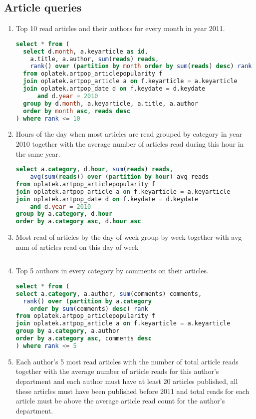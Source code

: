 \subsection*{Article queries} %
\label{sub:Article  queries}
\begin{enumerate}
\item    Top 10 read articles and their authors for every month in year 2011.
\begin{lstlisting}[language=sql] 
select * from (
  select d.month, a.keyarticle as id, 
    a.title, a.author, sum(reads) reads, 
    rank() over (partition by month order by sum(reads) desc) rank 
  from oplatek.artpop_articlepopularity f
  join oplatek.artpop_article a on f.keyarticle = a.keyarticle
  join oplatek.artpop_date d on f.keydate = d.keydate 
      and d.year = 2010
  group by d.month, a.keyarticle, a.title, a.author
  order by month asc, reads desc
) where rank <= 10
\end{lstlisting}
\item    Hours of the day when most articles are read grouped by category in year 2010 together with the average number of articles read during this hour in the same year.
\begin{lstlisting}[language=sql] 
select a.category, d.hour, sum(reads) reads, 
    avg(sum(reads)) over (partition by hour) avg_reads 
from oplatek.artpop_articlepopularity f
join oplatek.artpop_article a on f.keyarticle = a.keyarticle
join oplatek.artpop_date d on f.keydate = d.keydate 
    and d.year = 2010
group by a.category, d.hour
order by a.category asc, d.hour asc
\end{lstlisting}
\item    Most read of articles by the day of week group by week together with avg num of articles read on this day of week
\begin{lstlisting}[language=sql] 
\end{lstlisting}
\item    Top 5 authors in every category by comments on their articles.
\begin{lstlisting}[language=sql] 
select * from (
select a.category, a.author, sum(comments) comments, 
  rank() over (partition by a.category 
    order by sum(comments) desc) rank 
from oplatek.artpop_articlepopularity f
join oplatek.artpop_article a on f.keyarticle = a.keyarticle
group by a.category, a.author
order by a.category asc, comments desc
) where rank <= 5
\end{lstlisting}
\item    Each author's 5 most read articles with the number of total article reads together with the average number of article reads for this author's department and each author must have at least 20 articles published, all these articles must have been published before 2011 and total reads for each article must be above the average article read count for the author's department.

\end{enumerate}
